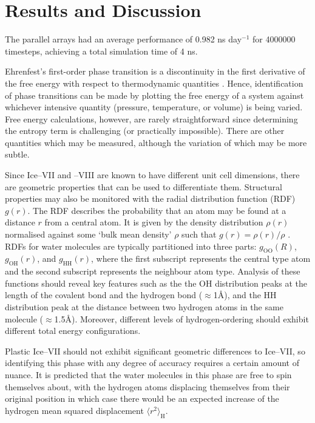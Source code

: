 \section{Results and Discussion}
The parallel arrays had an average performance of 0.982 ns day$^{-1}$
for 4000000 timesteps, achieving a total simulation time of 4 ns.

\par
Ehrenfest's first-order phase transition is a discontinuity in the first derivative of the
free energy with respect to thermodynamic quantities \cite{jaeger1998}.
Hence, identification of phase transitions can be made by plotting the free energy of a system
against whichever intensive quantity (pressure, temperature, or volume) is being varied.
Free energy calculations, however, are rarely straightforward since determining the entropy 
term is challenging (or practically impossible).
There are other quantities which may be measured, although the variation of which may be more subtle.

\par
Since Ice--VII and --VIII are known to have different unit cell dimensions, there are geometric
properties that can be used to differentiate them.
Structural properties may also be monitored with the radial distribution function (RDF) $g(r)$.
The RDF describes the probability that an atom may be found at a distance $r$ from a central atom.
It is given by the density distribution $\rho(r)$ normalised against some `bulk mean density' $\rho$ such that
$g(r) = \rho(r)/\rho$ \cite{goharshadi2025}.
RDFs for water molecules are typically partitioned into three parts: $g_\mathrm{OO}(R)$, $g_\mathrm{OH}(r)$, and
$g_\mathrm{HH}(r)$, where the first subscript represents the central type atom and the second subscript represents
the neighbour atom type.
Analysis of these functions should reveal key features such as the the OH distribution peaks at the length of the
covalent bond and the hydrogen bond ($\approx$1\AA{}), and the HH distribution peak at the distance between two hydrogen atoms in
the same molecule ($\approx$1.5\AA{}).
Moreover, different levels of hydrogen-ordering should exhibit different total energy configurations.

\par
Plastic Ice--VII should not exhibit significant geometric differences to Ice--VII, so identifying this phase with
any degree of accuracy requires a certain amount of nuance.
It is predicted that the water molecules in this phase are free to spin themselves about, with the hydrogen
atoms displacing themselves from their original position in which case there would be an expected increase
of the hydrogen mean squared displacement $\langle r^2 \rangle _\mathrm{H}$.

